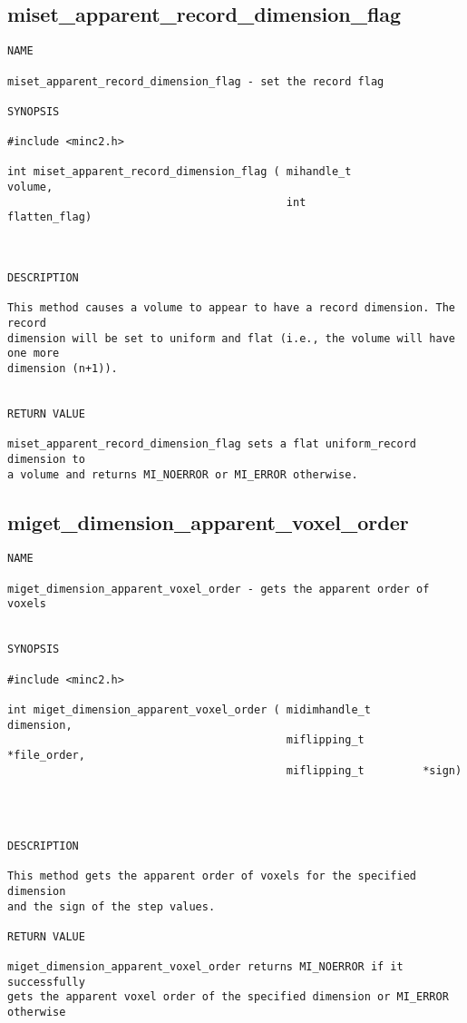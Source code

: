 \documentclass{article}
\begin{document}
\subsection{miset\_apparent\_record\_dimension\_flag}
\begin{verbatim}
NAME 

miset_apparent_record_dimension_flag - set the record flag

SYNOPSIS

#include <minc2.h>

int miset_apparent_record_dimension_flag ( mihandle_t           volume,
                                           int                  flatten_flag)
                                             


DESCRIPTION

This method causes a volume to appear to have a record dimension. The record
dimension will be set to uniform and flat (i.e., the volume will have one more
dimension (n+1)).


RETURN VALUE

miset_apparent_record_dimension_flag sets a flat uniform_record dimension to
a volume and returns MI_NOERROR or MI_ERROR otherwise. 
\end{verbatim}

\subsection{miget\_dimension\_apparent\_voxel\_order}
\begin{verbatim}
NAME 

miget_dimension_apparent_voxel_order - gets the apparent order of voxels


SYNOPSIS

#include <minc2.h>

int miget_dimension_apparent_voxel_order ( midimhandle_t        dimension,
                                           miflipping_t         *file_order,
                                           miflipping_t         *sign)
                                     



DESCRIPTION

This method gets the apparent order of voxels for the specified dimension
and the sign of the step values.

RETURN VALUE

miget_dimension_apparent_voxel_order returns MI_NOERROR if it successfully
gets the apparent voxel order of the specified dimension or MI_ERROR otherwise
\end{verbatim}
\end{document}
